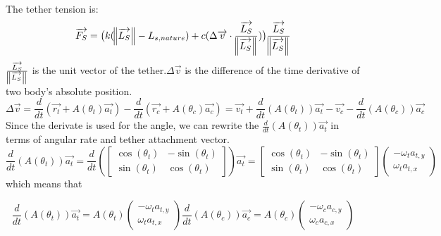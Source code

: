 The tether tension is: 
\begin{equation} \overrightarrow{F_S} = \bigl(k(\norm{\overrightarrow{L_S}} - L_{s,nature}) + c(\Delta\overrightarrow{v} \cdot 
	\frac{\overrightarrow{L_S}}{\norm{\overrightarrow{L_S}}})
	\bigr)
	\frac{\overrightarrow{L_S}}{
	\norm{
	\overrightarrow{L_S}
	}
	}
\end{equation}
$\frac{\overrightarrow{L_S}}{\norm{\overrightarrow{L_S}}}$ is the unit vector of the tether.$\Delta\overrightarrow{v}$ is the difference of the time derivative of two body's absolute position. 
\begin{equation}\Delta\overrightarrow{v} = \frac{d}{dt}(\overrightarrow{r_t}+A(\theta_t)\overrightarrow{a_t}) - \frac{d}{dt}(\overrightarrow{r_c} + A(\theta_c)\overrightarrow{a_c}) = \overrightarrow{v_t} + \frac{d}{dt}(A(\theta_t))\overrightarrow{a_t}-\overrightarrow{v_c}-\frac{d}{dt}(A(\theta_c))\overrightarrow{a_c}\end{equation}
Since the derivate is used for the angle, we can rewrite the $\frac{d}{dt}(A(\theta_t))\overrightarrow{a_t}$ in terms of angular rate and tether attachment vector.
\begin{equation}\frac{d}{dt}(A(\theta_t))\overrightarrow{a_t} = \frac{d}{dt}
\left(
\begin{bmatrix}
\cos(\theta_t) & -\sin(\theta_t)\\
\sin(\theta_t) & \cos(\theta_t)
\end{bmatrix} \right)
\overrightarrow{a_t} =
\begin{bmatrix}
\cos(\theta_t) & -\sin(\theta_t)\\
\sin(\theta_t) & \cos(\theta_t)
\end{bmatrix}
\left(
\begin{array}{c}
-\omega_ta_{t,y}\\
\omega_ta_{t,x}
\end{array}\right)
\end{equation}
which means that 

$$\frac{d}{dt}(A(\theta_t))\overrightarrow{a_t} = A(\theta_t)\left(
\begin{array}{c}
-\omega_ta_{t,y}\\
\omega_ta_{t,x}
\end{array}\right) \frac{d}{dt}(A(\theta_c))\overrightarrow{a_c} = A(\theta_c)\left(
\begin{array}{c}
-\omega_ca_{c,y}\\
\omega_ca_{c,x}
\end{array}\right)$$

